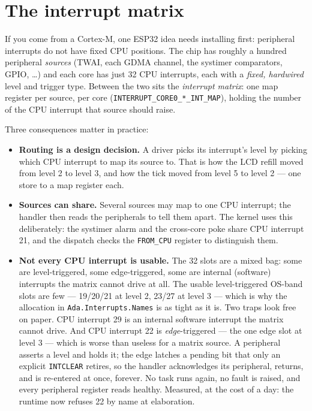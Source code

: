 \section{The interrupt matrix}

If you come from a Cortex-M, one ESP32 idea needs installing first: peripheral
interrupts do not have fixed CPU positions. The chip has roughly a hundred
peripheral \emph{sources} (TWAI, each GDMA channel, the systimer comparators,
GPIO, \dots) and each core has just 32 CPU interrupts, each with a
\emph{fixed, hardwired} level and trigger type. Between the two sits the
\emph{interrupt matrix}: one map register per source, per core
(\texttt{INTERRUPT\_CORE0\_*\_INT\_MAP}), holding the number of the CPU
interrupt that source should raise.

Three consequences matter in practice:

\begin{itemize}
  \item \textbf{Routing is a design decision.} A driver picks its
        interrupt's level by picking which CPU interrupt to map its source
        to. That is how the LCD refill moved from level 2 to level 3, and how
        the tick moved from level 5 to level 2 --- one store to a map
        register each.
  \item \textbf{Sources can share.} Several sources may map to one CPU
        interrupt; the handler then reads the peripherals to tell them apart.
        The kernel uses this deliberately: the systimer alarm and the
        cross-core poke share CPU interrupt 21, and the dispatch checks the
        \texttt{FROM\_CPU} register to distinguish them.
  \item \textbf{Not every CPU interrupt is usable.} The 32 slots are a mixed
        bag: some are level-triggered, some edge-triggered, some are internal
        (software) interrupts the matrix cannot drive at all. The usable
        level-triggered OS-band slots are few --- 19/20/21 at level 2, 23/27
        at level 3 --- which is why the allocation in
        \texttt{Ada.Interrupts.Names} is as tight as it is. Two traps look
        free on paper. CPU interrupt 29 is an internal software interrupt the
        matrix cannot drive. And CPU interrupt 22 is \emph{edge}-triggered ---
        the one edge slot at level 3 --- which is worse than useless for a
        matrix source. A peripheral asserts a level and holds it; the edge
        latches a pending bit that only an explicit \texttt{INTCLEAR}
        retires, so the handler acknowledges its peripheral, returns, and is
        re-entered at once, forever. No task runs again, no fault is raised,
        and every peripheral register reads healthy. Measured, at the cost of
        a day: the runtime now refuses 22 by name at elaboration.
\end{itemize}

